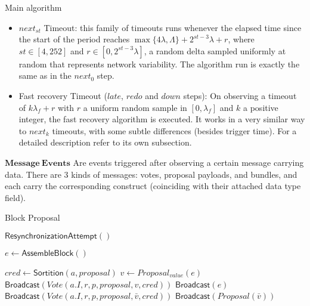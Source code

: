 \documentclass[10pt,a4paper]{article}
\begin{document}
\begin{section}{Main algorithm}
\begin{itemize}
    \item $next_{st}$ Timeout: this family of timeouts runs whenever the elapsed time since the start of the period reaches
    $\max\{4\lambda, \Lambda \} + 2^{st-3}\lambda + r$, where $st\in [4, 252]$ and $r \in [0, 2^{st-3}\lambda]$, a random 
    delta sampled uniformly at random that represents network variability.
    The algorithm run is exactly the same as in the $next_0$ step.

    \item Fast recovery Timeout ($late$, $redo$ and $down$ steps): On observing a timeout of $k\lambda_f + r$ with $r$ a uniform random sample in $[0, \lambda_f]$ and
    $k$ a positive integer, the fast recovery algorithm is executed. It works in a very similar way to $next_k$ timeouts, with some subtle differences (besides trigger time).
    For a detailed description refer to its own subsection.
\end{itemize}


$\mathbf{Message \ Events}$ Are events triggered after observing a certain message carrying data.
There are 3 kinds of messages: votes, proposal payloads, and bundles, and each carry
the corresponding construct (coinciding with their attached data type field).

\begin{subsection}{Block Proposal}\label{ssect:blockproposal}

    \begin{algorithm}
        \caption{\underline{Block proposal}}
        \label{algo:block-proposal}
        \begin{algorithmic}[1]

            \State $\mathsf{ResynchronizationAttempt}()$

            \State $e \gets \mathsf{AssembleBlock}()$

                \State $cred \gets 
                \mathsf{Sortition}(a, proposal)$
                        \State $v \gets Proposal_{value}(e)$
                        \State $\mathsf{Broadcast}(Vote(a.I, r, p, proposal, v, cred))$
                        \State $\mathsf{Broadcast}(e)$
                    \Else
                        \State $\mathsf{Broadcast}(Vote(a.I, r, p, proposal, \bar{v}, cred))$
                            \State $\mathsf{Broadcast}(Proposal(\bar{v}))$
                        \EndIf
                    \EndIf
                \EndIf
            \EndFor
        \EndFunction
        \end{algorithmic}
    \end{algorithm}


\end{subsection}
\end{section}
\end{document}
